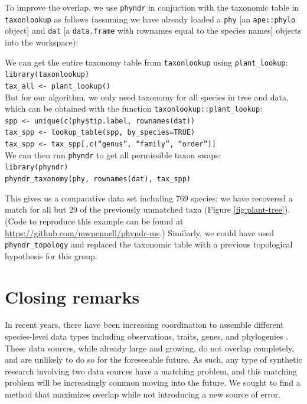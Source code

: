 \documentclass[a4paper,11pt]{article}
\newcommand{\phyndr}{\tt phyndr}
\newcommand{\taxonlookup}{\tt taxonlookup}
\begin{document}
To improve the overlap, we use {\phyndr} in conjuction with the taxonomic table in {\taxonlookup} as follows (assuming we have already loaded a \texttt{phy} [an \texttt{ape::phylo} object] and \texttt{dat} [a \texttt{data.frame} with rownames equal to the species names] objects into the workspace):
\begin{flushleft}
We can get the entire taxonomy table from {\taxonlookup} using \texttt{plant\_lookup}:\\
\texttt{library(taxonlookup)}\\
\texttt{tax\_all <- plant\_lookup()}\\
\bigskip
But for our algorithm, we only need taxonomy for all species in tree and data, which can be obtained with the function \texttt{taxonlookup::plant\_lookup}:\\
\texttt{spp <- unique(c(phy\$tip.label, rownames(dat))}\\
\texttt{tax\_spp <- lookup\_table(spp, by\_species=TRUE)}\\
\texttt{tax\_spp <- tax\_spp[,c(``genus'', ``family'', ``order'')]}\\
\bigskip
We can then run {\phyndr} to get all permissible taxon swaps:\\
\texttt{library(phyndr)}\\
\texttt{phyndr\_taxonomy(phy, rownames(dat), tax\_spp)}\\

\end{flushleft}
This gives us a comparative data set including 769 species; we have recovered a match for all but 29 of the previously unmatched taxa (Figure \ref{fig:plant-tree}). (Code to reproduce this example can be found at \url{https://github.com/mwpennell/phyndr-ms}.) Similarly, we could have used \texttt{phyndr\_topology} and replaced the taxonomic table with a previous topological hypothesis for this group.
 

\section{Closing remarks}

In recent years, there have been increasing coordination to assemble different species-level data types including observations, traits, genes, and phylogenies \citep{Parr2012}.  These data sources, while already large and growing, do not overlap completely, and are unlikely to do so for the foreseeable future.  As such, any type of synthetic research involving two data sources have a matching problem, and this matching problem will be increasingly common moving into the future.  We sought to find a method that maximizes overlap while not introducing a new source of error.  
\end{document}
